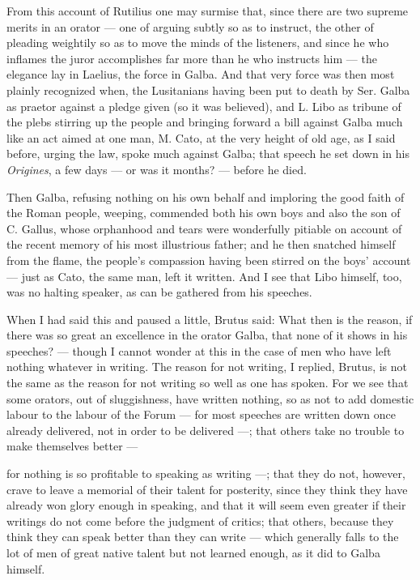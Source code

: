  From this account of Rutilius one may surmise that, since there are two supreme merits in an orator — one of arguing subtly so as to instruct, the other of pleading weightily so as to move the minds of the listeners, and since he who inflames the juror accomplishes far more than he who instructs him — the elegance lay in Laelius, the force in Galba. And that very force was then most plainly recognized when, the Lusitanians having been put to death by Ser. Galba as praetor against a pledge given (so it was believed), and L. Libo as tribune of the plebs stirring up the people and bringing forward a bill against Galba much like an act aimed at one man, M. Cato, at the very height of old age, as I said before, urging the law, spoke much against Galba; that speech he set down in his \textit{Origines}, a few days — or was it months? — before he died.

 Then Galba, refusing nothing on his own behalf and imploring the good faith of the Roman people, weeping, commended both his own boys and also the son of C. Gallus, whose orphanhood and tears were wonderfully pitiable on account of the recent memory of his most illustrious father; and he then snatched himself from the flame, the people's compassion having been stirred on the boys' account — just as Cato, the same man, left it written. And I see that Libo himself, too, was no halting speaker, as can be gathered from his speeches.

 When I had said this and paused a little, Brutus said: What then is the reason, if there was so great an excellence in the orator Galba, that none of it shows in his speeches? — though I cannot wonder at this in the case of men who have left nothing whatever in writing. The reason for not writing, I replied, Brutus, is not the same as the reason for not writing so well as one has spoken. For we see that some orators, out of sluggishness, have written nothing, so as not to add domestic labour to the labour of the Forum — for most speeches are written down once already delivered, not in order to be delivered —; that others take no trouble to make themselves better —

 for nothing is so profitable to speaking as writing —; that they do not, however, crave to leave a memorial of their talent for posterity, since they think they have already won glory enough in speaking, and that it will seem even greater if their writings do not come before the judgment of critics; that others, because they think they can speak better than they can write — which generally falls to the lot of men of great native talent but not learned enough, as it did to Galba himself.

